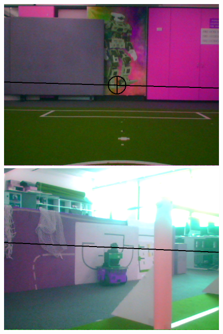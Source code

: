 \documentclass[runningheads,a4paper]{llncs}
\begin{document}
\begin{figure} [h]
\begin{minipage}[b]{0.5\textwidth}
\end{minipage}
\begin{minipage}[b]{0.5\textwidth}
\centering
\includegraphics[width=1\textwidth]{figures/img85.png}
\end{minipage}
\begin{minipage}[b]{0.5\textwidth}
\centering
\includegraphics[width=1\textwidth]{figures/img21.png}
\end{minipage}
\begin{minipage}[b]{0.5\textwidth}
\centering

\end{minipage}
\end{figure}
\end{document}
